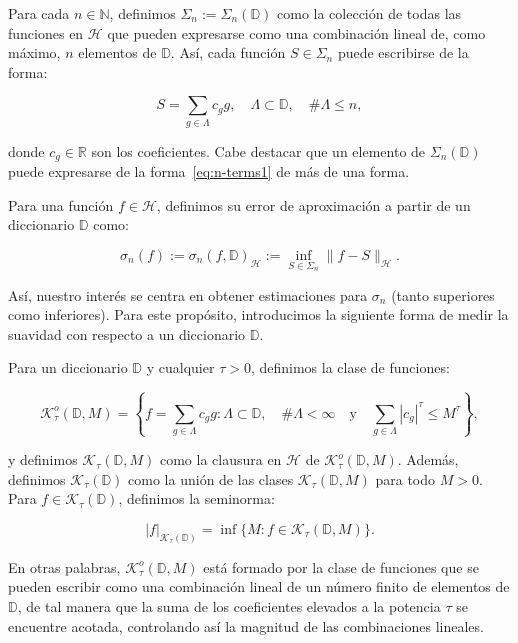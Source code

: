 Para cada $n \in \mathbb{N}$, definimos $\Sigma_n := \Sigma_n(\mathbb{D})$ como la colección de todas las funciones en $\mathcal{H}$ que pueden expresarse como una combinación lineal de, como máximo, $n$ elementos de $\mathbb{D}$. Así, cada función $S \in \Sigma_n$ puede escribirse de la forma:

\begin{equation}\label{eq:n-terms1}
    S = \sum_{g \in \Lambda} c_g g, \quad \Lambda \subset \mathbb{D}, \quad \#\Lambda \leq n,
\end{equation}

donde $c_g \in \mathbb{R}$ son los coeficientes. Cabe destacar que un elemento de $\Sigma_n(\mathbb{D})$ puede expresarse de la forma~\eqref{eq:n-terms1} de más de una forma.

\begin{definicion}
    Para una función $f \in \mathcal{H}$, definimos su error de aproximación a partir de un diccionario $\mathbb{D}$ como:

    \[
        \sigma_n(f) := \sigma_n(f, \mathbb{D})_{\mathcal{H}} := \inf_{S \in \Sigma_n} \| f - S \|_{\mathcal{H}}.
    \]
\end{definicion}

Así, nuestro interés se centra en obtener estimaciones para $\sigma_n$ (tanto superiores como inferiores). Para este propósito, introducimos la siguiente forma de medir la suavidad con respecto a un diccionario $\mathbb{D}$.

\begin{definicion}
    Para un diccionario $\mathbb{D}$ y cualquier $\tau > 0$, definimos la clase de funciones:

    \[
        \mathcal{K}_{\tau}^{o}(\mathbb{D}, M) = \left\{ f = \sum_{g \in \Lambda} c_g g : \Lambda \subset \mathbb{D}, \quad \#\Lambda < \infty \quad \text{y} \quad \sum_{g \in \Lambda} |c_g|^{\tau} \leq M^{\tau} \right\},
    \]

    y definimos $\mathcal{K}_{\tau}(\mathbb{D}, M)$ como la clausura en $\mathcal{H}$ de $\mathcal{K}_{\tau}^{o}(\mathbb{D}, M)$. Además, definimos $\mathcal{K}_{\tau}(\mathbb{D})$ como la unión de las clases $\mathcal{K}_{\tau}(\mathbb{D}, M)$ para todo $M > 0$. Para $f \in \mathcal{K}_{\tau}(\mathbb{D})$, definimos la seminorma:

    \[
        |f|_{\mathcal{K}_{\tau}(\mathbb{D})} = \inf\{ M : f \in \mathcal{K}_{\tau}(\mathbb{D}, M) \}.
    \]
\end{definicion}

En otras palabras, $\mathcal{K}_{\tau}^{o}(\mathbb{D}, M)$ está formado por la clase de funciones que se pueden escribir como una combinación lineal de un número finito de elementos de $\mathbb{D}$, de tal manera que la suma de los coeficientes elevados a la potencia $\tau$ se encuentre acotada, controlando así la magnitud de las combinaciones lineales.

